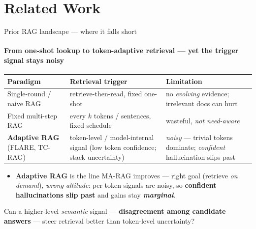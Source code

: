\documentclass[10pt, aspectratio=169, t]{beamer}   %
\newcommand{\good}[1]{{\color{posblue}\bfseries #1}}  %
\newcommand{\warn}[1]{{\color{negmag}\bfseries #1}}   %
\begin{document}
\section{Related Work}

\begin{frame}{Prior RAG landscape — where it falls short}
  \framesubtitle{From one-shot lookup to token-adaptive retrieval — yet the trigger signal stays noisy}
  \vfill
  \begin{center}
  \renewcommand{\arraystretch}{1.25}
  \setlength{\tabcolsep}{6pt}
  \begin{tabular}{@{}>{\raggedright\arraybackslash}p{} >{\raggedright\arraybackslash}p{} >{\raggedright\arraybackslash}p{}@{}}
    \toprule
    \textbf{Paradigm} & \textbf{Retrieval trigger} & \textbf{Limitation}\\
    \midrule
    Single-round / naive RAG & retrieve-then-read, fixed one-shot & no \emph{evolving} evidence; irrelevant docs can hurt\\
    Fixed multi-step RAG & every $k$ tokens / sentences, fixed schedule & wasteful, \emph{not need-aware}\\
    \rowcolor{accent!10}
    \textbf{Adaptive RAG} {\scriptsize(FLARE, TC-RAG)} & token-level / model-internal signal (low token confidence; stack uncertainty) & \emph{noisy} — trivial tokens dominate; \emph{confident} hallucination slips past\\
    \bottomrule
  \end{tabular}
  \end{center}
  \vfill
  \begin{itemize}\setlength{\itemsep}{6pt}
    \item \textbf{Adaptive RAG} is the line MA-RAG improves — right goal (retrieve \emph{on demand}), \emph{wrong altitude}: per-token signals are noisy, so \warn{confident hallucinations slip past} and gains stay \warn{\emph{marginal}}.
  \end{itemize}
  \vfill
  \begin{tcolorbox}[title={Key question}]
    Can a higher-level \emph{semantic} signal — \textbf{\good{disagreement among candidate answers}} — steer retrieval better than token-level uncertainty?
  \end{tcolorbox}
  \vfill
\end{frame}
\end{document}
